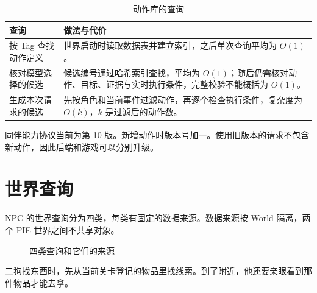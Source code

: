 \documentclass[11pt]{article}
\begin{document}
\begin{table}[H]
\small
\begin{tabularx}{\textwidth}{@{}l L@{}}
\toprule
\textbf{查询} & \textbf{做法与代价} \\
\midrule
按 Tag 查找动作定义 & 世界启动时读取数据表并建立索引，之后单次查询平均为 $O(1)$。 \\
核对模型选择的候选 & 候选编号通过哈希索引查找，平均为 $O(1)$；随后仍需核对动作、目标、证据与实时执行条件，完整校验不能概括为 $O(1)$。 \\
生成本次请求的候选 & 先按角色和当前事件过滤动作，再逐个检查执行条件，复杂度为 $O(k)$，$k$ 是过滤后的动作数。 \\
\bottomrule
\end{tabularx}
\caption{动作库的查询}
\end{table}

\begin{note}[协议版本]
同伴能力协议当前为第 10 版。新增动作时版本号加一。使用旧版本的请求不包含新动作，因此后端和游戏可以分别升级。
\end{note}

\section{世界查询}

NPC 的世界查询分为四类，每类有固定的数据来源。数据来源按 World 隔离，两个 PIE 世界之间不共享对象。

\begin{figure}[H]
\centering
\begin{adjustbox}{max width=\textwidth}
\end{adjustbox}
\caption{四类查询和它们的来源}
\end{figure}
二狗找东西时，先从当前关卡登记的物品里找线索。到了附近，他还要亲眼看到那件物品才能去拿。
\end{document}
